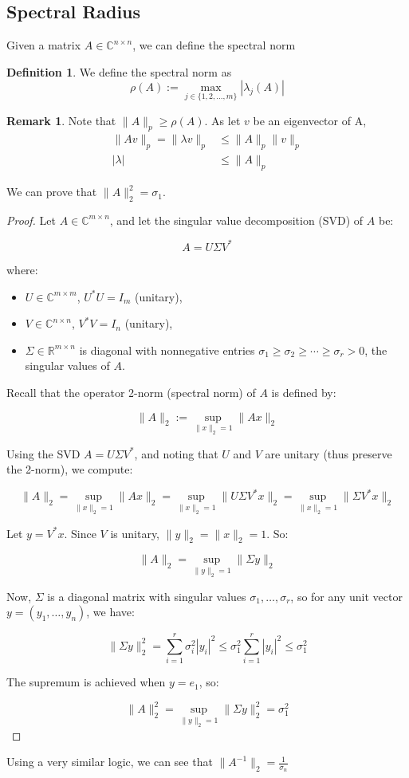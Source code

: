 \documentclass[11pt]{article}
\theoremstyle{definition}
\newtheorem{definition}{Definition}[section]
\newtheorem{remark}{Remark}[section]
\newcommand{\C}{\mathbb{C}}
\begin{document}
\subsection{Spectral Radius}
Given a matrix $A \in \C^{n \times n}$, we can define the spectral norm
\begin{definition}
  We define the spectral norm as 
  \[
  \rho (A) := \max_{j \in \{1, 2, \dots, m\}} \left| \lambda_j(A)\right|
  \]
\end{definition}
\begin{remark}
  Note that $\|A\|_p \geq \rho(A)$. As let $v$ be an eigenvector of A,
  \begin{align*}
    \|Av\|_p = \|\lambda v \|_p &\leq \|A\|_p \|v\|_p \\
    |\lambda| &\leq \|A\|_p
  \end{align*}
\end{remark}
We can prove that $\|A\|_2^2 = \sigma_1$.
\begin{proof}
  Let \( A \in \mathbb{C}^{m \times n} \), and let the singular value decomposition (SVD) of \( A \) be:

\[
A = U \Sigma V^*
\]

where:
\begin{itemize}
    \item \( U \in \mathbb{C}^{m \times m} \), \( U^* U = I_m \) (unitary),
    \item \( V \in \mathbb{C}^{n \times n} \), \( V^* V = I_n \) (unitary),
    \item \( \Sigma \in \mathbb{R}^{m \times n} \) is diagonal with nonnegative entries \( \sigma_1 \geq \sigma_2 \geq \cdots \geq \sigma_r > 0 \), the singular values of \( A \).
\end{itemize}

Recall that the operator 2-norm (spectral norm) of \( A \) is defined by:

\[
\|A\|_2 := \sup_{\|x\|_2 = 1} \|Ax\|_2
\]

Using the SVD \( A = U \Sigma V^* \), and noting that \( U \) and \( V \) are unitary (thus preserve the 2-norm), we compute:

\[
\|A\|_2 = \sup_{\|x\|_2 = 1} \|A x\|_2 
= \sup_{\|x\|_2 = 1} \|U \Sigma V^* x\|_2
= \sup_{\|x\|_2 = 1} \|\Sigma V^* x\|_2
\]

Let \( y = V^* x \). Since \( V \) is unitary, \( \|y\|_2 = \|x\|_2 = 1 \). So:

\[
\|A\|_2 = \sup_{\|y\|_2 = 1} \|\Sigma y\|_2
\]

Now, \( \Sigma \) is a diagonal matrix with singular values \( \sigma_1, \dots, \sigma_r \), so for any unit vector \( y = (y_1, \dots, y_n) \), we have:

\[
\|\Sigma y\|_2^2 = \sum_{i=1}^{r} \sigma_i^2 |y_i|^2 \leq \sigma_1^2 \sum_{i=1}^{r} |y_i|^2 \leq \sigma_1^2
\]

The supremum is achieved when \( y = e_1 \), so:

\[
\|A\|_2^2 = \sup_{\|y\|_2 = 1} \|\Sigma y\|_2^2 = \sigma_1^2
\]
\end{proof}
Using a very similar logic, we can see that $\|A^{-1}\|_2 = \frac{1}{\sigma_n}$
\end{document}
